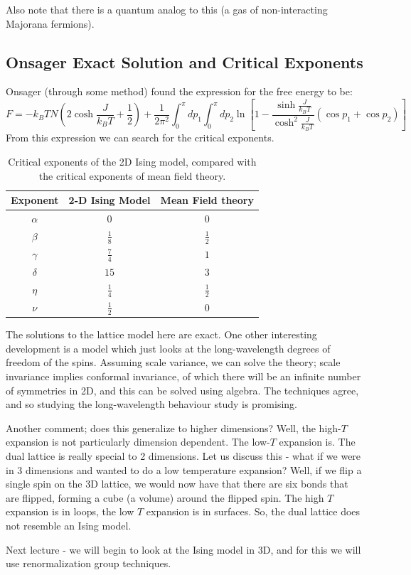 Also note that there is a quantum analog to this (a gas of non-interacting Majorana fermions).

\subsection{Onsager Exact Solution and Critical Exponents}
Onsager (through some method) found the expression for the free energy to be:
\begin{equation}
    F = -k_B T N \left(2\cosh\frac{J}{k_B T} + \frac{1}{2}\right) + \frac{1}{2\pi^2}\int_0^\pi dp_1 \int_0^\pi dp_2 \ln\left[1 - \frac{\sinh\frac{J}{k_B T}}{\cosh^2\frac{J}{k_B T}}\left(\cos p_1 + \cos p_2\right)\right]
\end{equation}
From this expression we can search for the critical exponents.
\begin{table}[htbp]
    \centering\begin{tabular}{|c|c|c|}
        \hline Exponent & 2-D Ising Model & Mean Field theory
        \\ \hline $\alpha$ & $0$ & $0$
        \\ $\beta$ & $\frac{1}{8}$ & $\frac{1}{2}$
        \\ $\gamma$ & $\frac{7}{4}$ & $1$
        \\ $\delta$ & $15$ & $3$
        \\ $\eta$ & $\frac{1}{4}$ & $\frac{1}{2}$
        \\ $\nu$ & $\frac{1}{2}$ & $0$
        \\ \hline
    \end{tabular}
    \caption{Critical exponents of the 2D Ising model, compared with the critical exponents of mean field theory.}
    \label{table-2dIsingcriticalexponents}
\end{table}
The solutions to the lattice model here are exact. One other interesting development is a model which just looks at the long-wavelength degrees of freedom of the spins. Assuming scale variance, we can solve the theory; scale invariance implies conformal invariance, of which there will be an infinite number of symmetries in 2D, and this can be solved using algebra. The techniques agree, and so studying the long-wavelength behaviour study is promising.

Another comment; does this generalize to higher dimensions? Well, the high-$T$ expansion is not particularly dimension dependent. The low-$T$ expansion is. The dual lattice is really special to 2 dimensions. Let us discuss this - what if we were in 3 dimensions and wanted to do a low temperature expansion? Well, if we flip a single spin on the 3D lattice, we would now have that there are six bonds that are flipped, forming a cube (a volume) around the flipped spin. The high $T$ expansion is in loops, the low $T$ expansion is in surfaces. So, the dual lattice does not resemble an Ising model.

Next lecture - we will begin to look at the Ising model in 3D, and for this we will use renormalization group techniques.